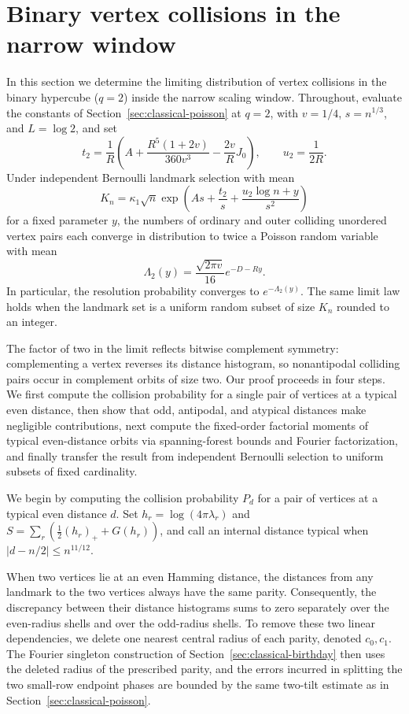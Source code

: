 \section{Binary vertex collisions in the narrow window}
\label{sec:binary-orbit-poisson}

In this section we determine the limiting distribution of vertex collisions in the binary hypercube (\(q=2\)) inside the narrow scaling window. Throughout, evaluate the constants of Section~\ref{sec:classical-poisson} at \(q=2\), with \(v=1/4\), \(s=n^{1/3}\), and \(L=\log 2\), and set
\[
 t_2=\frac{1}{R}\left(A+\frac{R^5(1+2v)}{360v^3}
                      -\frac{2v}{R}J_0\right),
 \qquad u_2=\frac{1}{2R}.
\]
Under independent Bernoulli landmark selection with mean
\[
 K_n=\kappa_1\sqrt n\exp\left(As+\frac{t_2}{s}
                         +\frac{u_2\log n+y}{s^2}\right)
\]
for a fixed parameter \(y\), the numbers of ordinary and outer colliding unordered vertex pairs each converge in distribution to twice a Poisson random variable with mean
\[
 \Lambda_2(y)=\frac{\sqrt{2\pi v}}{16}e^{-D-Ry}.
\]
In particular, the resolution probability converges to \(e^{-\Lambda_2(y)}\). The same limit law holds when the landmark set is a uniform random subset of size \(K_n\) rounded to an integer.

The factor of two in the limit reflects bitwise complement symmetry: complementing a vertex reverses its distance histogram, so nonantipodal colliding pairs occur in complement orbits of size two. Our proof proceeds in four steps. We first compute the collision probability for a single pair of vertices at a typical even distance, then show that odd, antipodal, and atypical distances make negligible contributions, next compute the fixed-order factorial moments of typical even-distance orbits via spanning-forest bounds and Fourier factorization, and finally transfer the result from independent Bernoulli selection to uniform subsets of fixed cardinality.

We begin by computing the collision probability \(P_d\) for a pair of vertices at a typical even distance \(d\). Set \(h_r=\log(4\pi\lambda_r)\) and \(S=\sum_r(\tfrac12(h_r)_++G(h_r))\), and call an internal distance typical when \(|d-n/2|\le n^{11/12}\).

When two vertices lie at an even Hamming distance, the distances from any landmark to the two vertices always have the same parity. Consequently, the discrepancy between their distance histograms sums to zero separately over the even-radius shells and over the odd-radius shells. To remove these two linear dependencies, we delete one nearest central radius of each parity, denoted \(c_0,c_1\). The Fourier singleton construction of Section~\ref{sec:classical-birthday} then uses the deleted radius of the prescribed parity, and the errors incurred in splitting the two small-row endpoint phases are bounded by the same two-tilt estimate as in Section~\ref{sec:classical-poisson}.

